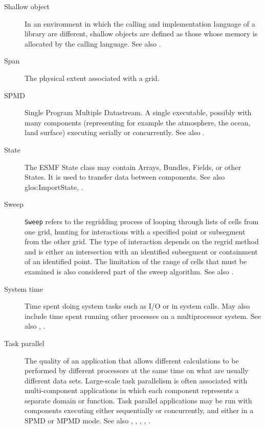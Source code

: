 \begin{description}
\label{glos:ShallowObjects} 
\item[Shallow object] 
  In an environment
  in which the calling and implementation language of a library are
  different, shallow objects are defined as those whose memory is 
  allocated by the calling language. 
  See also .

\label{glos:Span} 
\item[Span] 
  The physical extent associated with a grid.

\label{glos:SPMD} 
\item[SPMD] 
  Single Program Multiple Datastream. 
  A single executable, possibly with many components (representing 
  for example the atmosphere, the ocean, land surface) executing 
  serially or concurrently. See also . 

\label{glos:State} 
\item [State] 
  The ESMF State class may 
  contain Arrays, Bundles, Fields, or other States.  It is used to 
  transfer data between components.  See also 
  {glos:ImportState}, .

\label{glos:Sweep} 
\item[Sweep]
  {\tt Sweep} refers to the regridding process of looping through lists of cells
  from one grid, hunting for interactions with a specified point or subsegment
  from the other grid.  The type of interaction depends on the regrid method
  and is either an intersection with an identified subsegment or containment
  of an identified point.  The limitation of the range of cells that must be
  examined is also considered part of the sweep algorithm.
  See also .

\label{glos:SysTime} 
\item [System time] 
  Time spent doing system tasks 
  such as I/O or in system calls.  May also include time spent running 
  other processes on a multiprocessor system. See also , .

\label{glos:TaskParallel}  
\item[Task parallel] 
  The quality of an application that allows
  different calculations to be performed by different processors at the same 
  time on what are usually different data sets.  Large-scale task parallelism 
  is often associated with multi-component applications in which each component
  represents a separate domain or function.  Task parallel applications 
  may be run with components executing either sequentially or concurrently, 
  and either in a SPMD or MPMD mode. See also 
  , 
  , , 
  , 
  .


\end{description}
